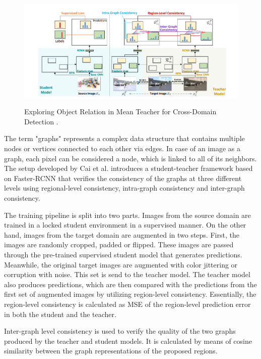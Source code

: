 \documentclass[english, 12pt, a4paper, elec, utf8, a-1b, online]{aaltothesis}
\begin{document}
\begin{figure}[htb]
	\begin{center}
		\includegraphics[width=16cm]{./graph_teacher.png}
	\end{center}
	\caption{Exploring Object Relation in Mean Teacher for Cross-Domain Detection \cite{Cai2019}.}
	\begin{center}
		\label{graph_MT}
	\end{center}
\end{figure}
\FloatBarrier

The term "graphs" represents a complex data structure that contains multiple nodes or vertices connected to each other via edges. In case of an image as a graph, each pixel can be considered a node, which is linked to all of its neighbors. 
The setup developed by Cai et al. \cite{Cai2019} introduces a student-teacher framework based on Faster-RCNN that verifies the consistency of the graphs at three different levels using regional-level consistency, intra-graph consistency and inter-graph consistency. 

The training pipeline is split into two parts. Images from the source domain are trained in a locked student environment in a supervised manner.  On the other hand, images from the target domain are augmented in two steps. First, the images are randomly cropped, padded or flipped. These images are passed through the pre-trained supervised student model that generates predictions. Meanwhile, the original target images are augmented with color jittering or corruption with noise. This set is send to the teacher model. The teacher model also produces predictions, which are then compared with the predictions from the first set of augmented images by utilizing region-level consistency. Essentially, the region-level consistency is calculated as MSE of the region-level prediction error in  both the student and the teacher. 

Inter-graph level consistency is used to verify the quality of the two graphs produced by the teacher and student models. It is calculated by means of cosine similarity between the graph representations of the proposed regions. 
\end{document}
